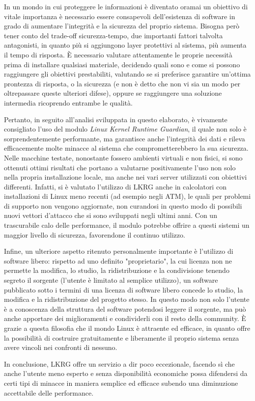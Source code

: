 
\label{Chapter5}

In un mondo in cui proteggere le informazioni è diventato oramai un obiettivo di vitale importanza è necessario essere consapevoli dell'esistenza di software in grado di aumentare l'integrità e la sicurezza del proprio sistema. Bisogna però tener conto del trade-off sicurezza-tempo, due importanti fattori talvolta antagonisti, in quanto più si aggiungono layer protettivi al sistema, più aumenta il tempo di risposta. È necessario valutare attentamente le proprie necessità prima di installare qualsiasi materiale, decidendo quali sono e come si possono raggiungere gli obiettivi prestabiliti, valutando se si preferisce garantire un'ottima prontezza di risposta, o la sicurezza (e non è detto che non vi sia un modo per oltrepassare queste ulteriori difese), oppure se raggiungere una soluzione intermedia ricoprendo entrambe le qualità.

Pertanto, in seguito all'analisi sviluppata in questo elaborato, è vivamente consigliato l'uso del modulo \emph{Linux Kernel Runtime Guardian}, il quale non solo è sorprendentemente performante, ma garantisce anche l'integrità dei dati e rileva efficacemente molte minacce al sistema che comprometterebbero la sua sicurezza. Nelle macchine testate, nonostante fossero ambienti virtuali e non fisici, si sono ottenuti ottimi risultati che portano a valutarne positivamente l'uso non solo nella propria installazione locale, ma anche nei vari server utilizzati con obiettivi differenti. Infatti, si è valutato l'utilizzo di LKRG anche in calcolatori con installazioni di Linux meno recenti (ad esempio negli ATM), le quali per problemi di supporto non vengono aggiornate, non curandosi in questo modo di possibili nuovi vettori d'attacco che si sono sviluppati negli ultimi anni. Con un trascurabile calo delle performance, il modulo potrebbe offrire a questi sistemi un maggior livello di sicurezza, favorendone il continuo utilizzo.

Infine, un ulteriore aspetto ritenuto personalmente importante è l'utilizzo di software libero: rispetto ad uno definito "proprietario", la cui licenza non ne permette la modifica, lo studio, la ridistribuzione e la condivisione tenendo segreto il sorgente (l'utente è limitato al semplice utilizzo), un software pubblicato sotto i termini di una licenza di software libero concede lo studio, la modifica e la ridistribuzione del progetto stesso. In questo modo non solo l'utente è a conoscenza della struttura del software potendosi leggere il sorgente, ma può anche apportare dei miglioramenti e condividerli con il resto della community. È grazie a questa filosofia che il mondo Linux è attraente ed efficace, in quanto offre la possibilità di costruire gratuitamente e liberamente il proprio sistema senza avere vincoli nei confronti di nessuno. 

In conclusione, LKRG offre un servizio a dir poco eccezionale, facendo sì che anche l'utente meno esperto e senza disponibilità economiche possa difendersi da certi tipi di minacce in maniera semplice ed efficace subendo una diminuzione accettabile delle performance.

